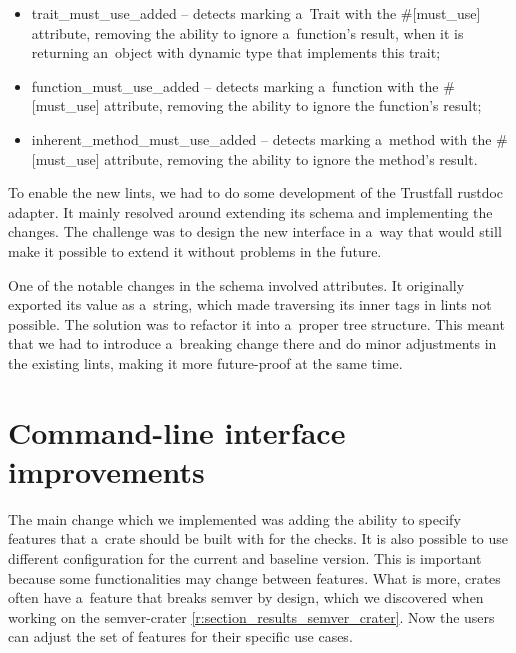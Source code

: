 \documentclass[licencjacka,en]{pracamgr}
\begin{document}
\begin{itemize}
    \item {\ttfamily trait\_must\_use\_added}
        -- detects marking a~{\ttfamily Trait} with the {\ttfamily \#[must\_use]} attribute,
        removing the ability to ignore a~function's result, when it is returning an~object
        with dynamic type that implements this trait;
    \item {\ttfamily function\_must\_use\_added}
        -- detects marking a~function with the {\ttfamily \#[must\_use]} attribute,
        removing the ability to ignore the function's result;
    \item {\ttfamily inherent\_method\_must\_use\_added}
        -- detects marking a~method with the {\ttfamily \#[must\_use]} attribute,
        removing the ability to ignore the method's result.
\end{itemize}
To enable the new lints, we had to do some development of the Trustfall rustdoc adapter.
It mainly resolved around extending its schema and implementing the changes.
The challenge was to design the new interface in a~way that would
still make it possible to extend it without problems in the future.

One of the notable changes in the schema involved attributes.
It originally exported its value as a~string, which made traversing
its inner tags in lints not possible.
The solution was to refactor it into a~proper tree structure.
This meant that we had to introduce a~breaking change there
and do minor adjustments in the existing lints,
making it more future-proof at the same time.

\section{Command-line interface improvements}\label{r:section_cli}

The main change which we implemented was adding the ability to specify
features that a~crate should be built with for the checks. It is also
possible to use different configuration for the current and baseline version.
This is important because some functionalities may change between features. What is more,
crates often have a~feature that breaks semver by design, which
we discovered when working on the semver-crater \ref{r:section_results_semver_crater}.
Now the users can adjust the set of features for their specific use cases.
\end{document}
